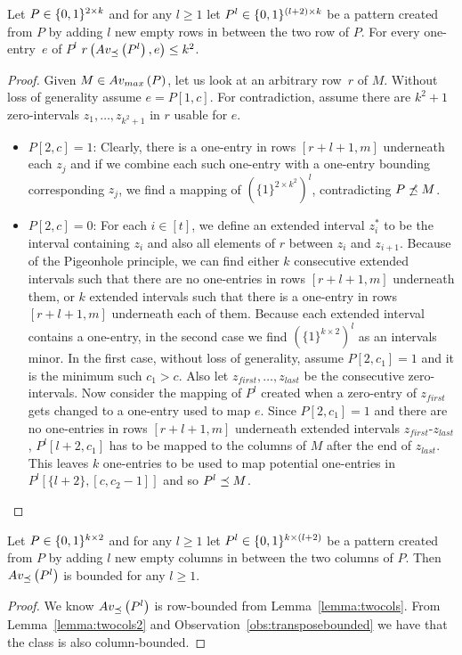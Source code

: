\begin{lemma}
\label{lemma:twocols2}
Let $P\in\{0,1\}^{2\times k}$ and for any $l\geq1$ let $P^l\in\{0,1\}^{(l+2)\times k}$ be a pattern created from $P$ by adding $l$ new empty rows in between the two row of $P$. For every one-entry~$e$ of $P^l$ $r\left(Av_{\preceq}\left(P^l\right),e\right)\leq k^2$.
\end{lemma}
\begin{proof}
Given $M\in Av_{max}\left(P\right)$, let us look at an arbitrary row~$r$ of $M$. Without loss of generality assume $e=P[1,c]$. For contradiction, assume there are $k^2+1$ zero-intervals $z_1,\dots,z_{k^2+1}$ in $r$ usable for $e$.
\begin{itemize}
	\item $P[2,c]=1$: Clearly, there is a one-entry in rows $[r+l+1,m]$ underneath each $z_j$ and if we combine each such one-entry with a one-entry bounding corresponding $z_j$, we find a mapping of $\left(\{1\}^{2\times k^2}\right)^l$, contradicting $P\not\preceq M$.
	\item $P[2,c]=0$: For each $i\in[t]$, we define an extended interval $z^*_i$ to be the interval containing $z_i$ and also all elements of $r$ between $z_i$ and $z_{i+1}$. Because of the Pigeonhole principle, we can find either $k$ consecutive extended intervals such that there are no one-entries in rows $[r+l+1,m]$ underneath them, or $k$ extended intervals such that there is a one-entry in rows $[r+l+1,m]$ underneath each of them. Because each extended interval contains a one-entry, in the second case we find $\left(\{1\}^{k\times2}\right)^l$ as an intervals minor. In the first case, without loss of generality, assume $P[2,c_1]=1$ and it is the minimum such $c_1>c$. Also let $z_{first},\dots,z_{last}$ be the consecutive zero-intervals. Now consider the mapping of $P^l$ created when a zero-entry of $z_{first}$ gets changed to a one-entry used to map $e$. Since $P[2,c_1]=1$ and there are no one-entries in rows $[r+l+1,m]$ underneath extended intervals $z_{first}$-$z_{last}$, $P^l[l+2,c_1]$ has to be mapped to the columns of $M$ after the end of $z_{last}$. This leaves $k$ one-entries to be used to map potential one-entries in $P^l[\{l+2\},[c,c_2-1]]$ and so $P^l\preceq M$.
\end{itemize}
\end{proof}

\begin{cor}
\label{cor:twocols}
Let $P\in\{0,1\}^{k\times2}$ and for any $l\geq1$ let $P^l\in\{0,1\}^{k\times(l+2)}$ be a pattern created from $P$ by adding $l$ new empty columns in between the two columns of $P$. Then $Av_{\preceq}\left(P^l\right)$ is bounded for any $l\geq1$.
\end{cor}
\begin{proof}
We know $Av_{\preceq}\left(P^l\right)$ is row-bounded from Lemma~\ref{lemma:twocols}. From Lemma~\ref{lemma:twocols2} and Observation~\ref{obs:transposebounded} we have that the class is also column-bounded.
\end{proof}

